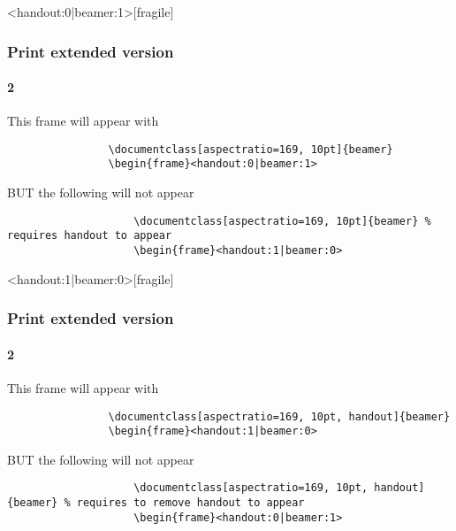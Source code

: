 		\begin{frame}<handout:0|beamer:1>[fragile]
			\frametitle{Print extended version}
			\framesubtitle{2}
			
			This frame will appear with
			\begin{verbatim}			
				\documentclass[aspectratio=169, 10pt]{beamer}
				\begin{frame}<handout:0|beamer:1>
			\end{verbatim}
			
			BUT the following will not appear
			\begin{verbatim}			
					\documentclass[aspectratio=169, 10pt]{beamer} % requires handout to appear
					\begin{frame}<handout:1|beamer:0>
			\end{verbatim}
		\end{frame}
				
		\begin{frame}<handout:1|beamer:0>[fragile]
			\frametitle{Print extended version}
			\framesubtitle{2}
			
			This frame will appear with
			\begin{verbatim}			
				\documentclass[aspectratio=169, 10pt, handout]{beamer}
				\begin{frame}<handout:1|beamer:0>
			\end{verbatim}
			
			BUT the following will not appear
			\begin{verbatim}			
					\documentclass[aspectratio=169, 10pt, handout]{beamer} % requires to remove handout to appear
					\begin{frame}<handout:0|beamer:1>
			\end{verbatim}
		\end{frame}
